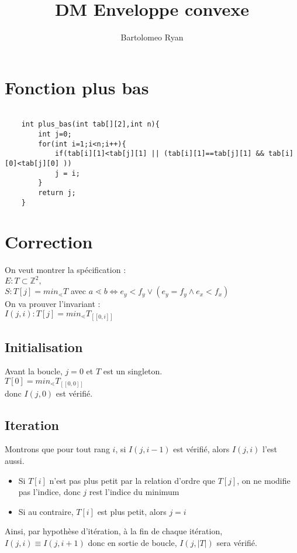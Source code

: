 \documentclass{article}
\title{DM Enveloppe convexe}
\author{Bartolomeo Ryan}
\begin{document}
\maketitle


\section{Fonction plus bas}
\begin{verbatim}

    int plus_bas(int tab[][2],int n){
        int j=0;
        for(int i=1;i<n;i++){
            if(tab[i][1]<tab[j][1] || (tab[i][1]==tab[j][1] && tab[i][0]<tab[j][0] ))
            j = i;
        }
        return j;
    }

\end{verbatim}
\section{Correction}
On veut montrer la spécification :  \\ 
$E : T \subset \mathbb{Z}^2, $   \\
$S : T[j]=min_{\lessdot} T$ avec  $a \lessdot b  \Leftrightarrow e_y<f_y \lor (e_y=f_y \land e_x<f_x)$\\

On va prouver l'invariant : \\
$I(j,i): T[j]=min_{\lessdot} T_{[\![ 0,i ]\!]}$
\subsection{Initialisation}
Avant la boucle, $j=0$ et $T$ est un singleton.\\
$T[0]=min_{\lessdot} T_{[\![ 0,0 ]\!]}$ \\
donc $I(j,0)$ est vérifié.
\subsection{Iteration}
Montrons que pour tout rang $i$, si  $I(j,i-1)$ est vérifié, alors $I(j,i)$ l'est aussi.
\begin{itemize}
    \item Si $T[i]$ n'est pas plus petit par la relation d'ordre que $T[j]$, on ne modifie pas l'indice, donc $j$ rest l'indice du minimum
    \item Si au contraire, $T[i]$ est plus petit, alors $j=i$
\end{itemize}
Ainsi, par hypothèse d'itération, à la fin de chaque itération, $I(j,i) \equiv I(j,i+1)$ donc en sortie de boucle, $I(j,|T|)$ sera vérifié.
\end{document}
